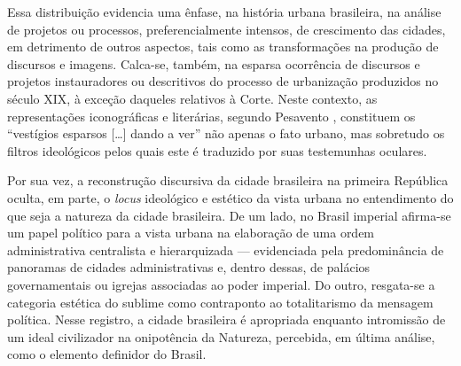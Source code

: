 Essa distribuição evidencia uma ênfase, na história urbana brasileira,
na análise de projetos ou processos, preferencialmente intensos, de
crescimento das cidades, em detrimento de outros aspectos, tais como as
transformações na produção de discursos e imagens. Calca-se, também, na
esparsa ocorrência de discursos e projetos instauradores ou descritivos
do processo de urbanização produzidos no século XIX, à exceção daqueles
relativos à Corte. Neste contexto, as representações iconográficas e
literárias, segundo Pesavento \autocite*[ p.~665]{pesavento:2001busca},
constituem os ``vestígios esparsos {[}\ldots{]} dando a ver'' não apenas
o fato urbano, mas sobretudo os filtros ideológicos pelos quais este é
traduzido por suas testemunhas oculares.

Por sua vez, a reconstrução discursiva da cidade brasileira na primeira
República oculta, em parte, o \emph{locus} ideológico e estético da
vista urbana no entendimento do que seja a natureza da cidade
brasileira. De um lado, no Brasil imperial afirma-se um papel político
para a vista urbana na elaboração de uma ordem administrativa
centralista e hierarquizada --- evidenciada pela predominância de
panoramas de cidades administrativas e, dentro dessas, de palácios
governamentais ou igrejas associadas ao poder imperial. Do outro,
resgata-se a categoria estética do sublime
\autocite{naxara:2004cientificismo} como contraponto ao totalitarismo da
mensagem política. Nesse registro, a cidade brasileira é apropriada
enquanto intromissão de um ideal civilizador na onipotência da Natureza,
percebida, em última análise, como o elemento definidor do Brasil.
